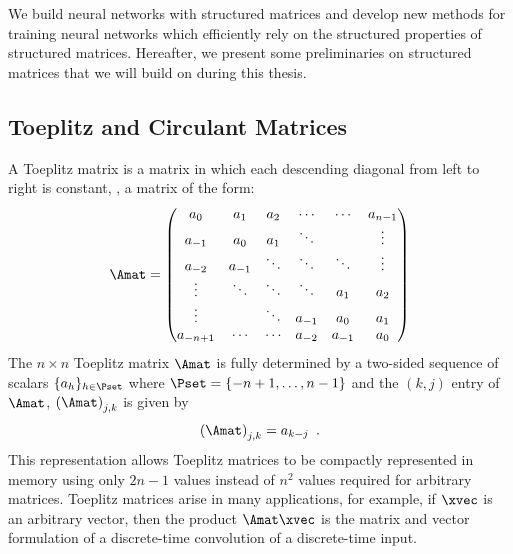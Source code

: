 


We build neural networks with structured matrices and develop new methods for training neural networks which efficiently rely on the structured properties of structured matrices. 
Hereafter, we present some preliminaries on structured matrices that we will build on during this thesis.


\subsection{Toeplitz and Circulant Matrices}
\label{subsection:ch2-toeplitz_and_circulant_matrices}

A Toeplitz matrix is a matrix in which each descending diagonal from left to right is constant, \ie, a matrix of the form:
\begin{equation}
  \Amat =
  \leftmatrix
    a_0      & a_1    & a_{2}  & \cdots & \cdots & a_{n-1} \\
    a_{-1}   & a_0    & a_{1}  & \ddots &        & \vdots  \\
    a_{-2}   & a_{-1} & \ddots & \ddots & \ddots & \vdots  \\
    \vdots   & \ddots & \ddots & \ddots & a_{1}  & a_2     \\
    \vdots   &        & \ddots & a_{-1} & a_{0}  & a_1     \\
    a_{-n+1} & \cdots & \cdots & a_{-2} & a_{-1} & a_0
  \rightmatrix
\end{equation}
\noindent
The $n \times n$ Toeplitz matrix $\Amat$ is fully determined by a two-sided sequence of scalars $\{a_h\}_{h \in \Pset}$ where $\Pset = \{-n+1, \dots, n-1\}$ and the $(k,j)$ entry of $\Amat$, $\leftmat \Amat \rightmat_{j,k}$ is given by
\begin{equation}
  \leftmat \Amat \rightmat_{j,k} = a_{k-j} \enspace.
\end{equation}
\noindent
This representation allows Toeplitz matrices to be compactly represented in memory using only $2n-1$ values instead of $n^2$ values required for arbitrary matrices.
Toeplitz matrices arise in many applications, for example, if $\xvec$ is an arbitrary vector, then the product $\Amat \xvec$ is the matrix and vector formulation of a discrete-time convolution of a discrete-time input.

